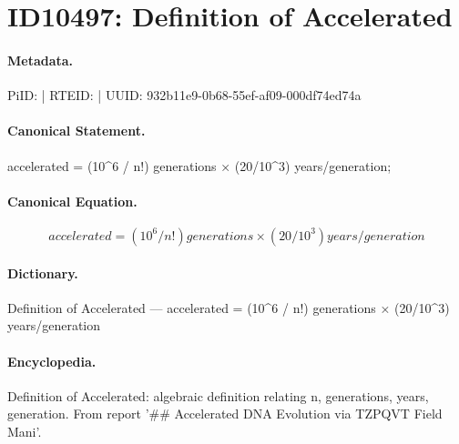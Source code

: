 \section*{ID10497: Definition of Accelerated}
\paragraph{Metadata.}
PiID:  | RTEID:  | UUID: 932b11e9-0b68-55ef-af09-000df74ed74a

\paragraph{Canonical Statement.}
accelerated = (10\textasciicircum{}6 / n!) generations × (20/10\textasciicircum{}3) years/generation;

\paragraph{Canonical Equation.}
\[
accelerated = (10^6 / n!) generations × (20/10^3) years/generation
\]

\paragraph{Dictionary.}
Definition of Accelerated — accelerated = (10\textasciicircum{}6 / n!) generations × (20/10\textasciicircum{}3) years/generation

\paragraph{Encyclopedia.}
Definition of Accelerated: algebraic definition relating n, generations, years, generation. From report '\#\# Accelerated DNA Evolution via TZPQVT Field Mani'.
